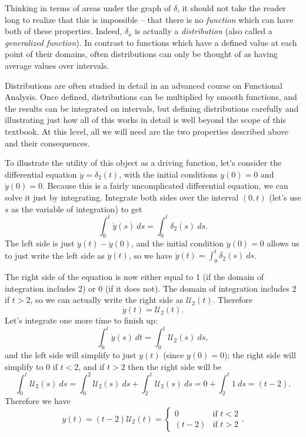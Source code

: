 {{{Thinking in terms of areas under the graph of $\delta$, it should not take the reader long to realize that this is impossible -- that there is no {\it function} which can have both of these properties.  Indeed, $\delta_a$ is actually a {\it distribution} (also called a {\it generalized function}).    In contrast to functions which have a defined value at each point of their domains, often distributions can only be thought of as having average values over intervals.

Distributions are often studied in detail in an advanced course on Functional Analysis.  Once defined, distributions can be multiplied by smooth functions, and the results can be integrated on intervals, but defining distributions carefully and illustrating just how all of this works in detail is well beyond the scope of this textbook.  At this level, all we will need are the two properties described above and their consequences.

To illustrate the utility of this object as a driving function, let's consider the differential equation $\ddot{y}=\delta_2(t)$, with the initial conditions $y(0)=0$ and $\dot{y}(0)=0$.  Because this is a fairly uncomplicated differential equation, we can solve it just by integrating.  Integrate both sides over the interval $(0,t)$ (let's use $s$ as the variable of integration) to get
\[ \int_0^t \ddot{y}(s) \ ds = \int_0^t \delta_2(s) \ ds.\]
The left side is just $\dot{y}(t) - \dot{y}(0)$, and the initial condition $\dot{y}(0)=0$ allows us to just write the left side as $\dot{y}(t)$, so we have $\dot{y}(t) = \int_0^t \delta_2(s) \ ds$.

The right side of the equation is now either equal to 1 (if the domain of integration includes 2) or 0 (if it does not).  The domain of integration includes 2 if $t>2$, so we can actually write the right side as $\mathcal{U}_2(t)$.  Therefore
\[ \dot{y}(t) = \mathcal{U}_2(t).\]
Let's integrate one more time to finish up:
\[ \int_0^t \dot{y}(s) \ dt = \int_0^t \mathcal{U}_2(s) \ ds,\]
and the left side will simplify to just $y(t)$ (since $y(0)=0$); the right side will simplify to 0 if $t<2$, and if $t>2$ then the right side will be 
\[ \int_0^t \mathcal{U}_2(s) \ ds = \int_0^2 \mathcal{U}_2(s) \ ds + \int_2^t \mathcal{U}_2(s) \ ds = 0 + \int_2^t 1 \ ds = (t-2).\]
Therefore we have
\[ y(t) = (t-2) \mathcal{U}_2(t) = \begin{cases} 0 & \mbox{if } t < 2 \\ (t-2) & \mbox{if } t > 2 \end{cases}.\]

}}}
